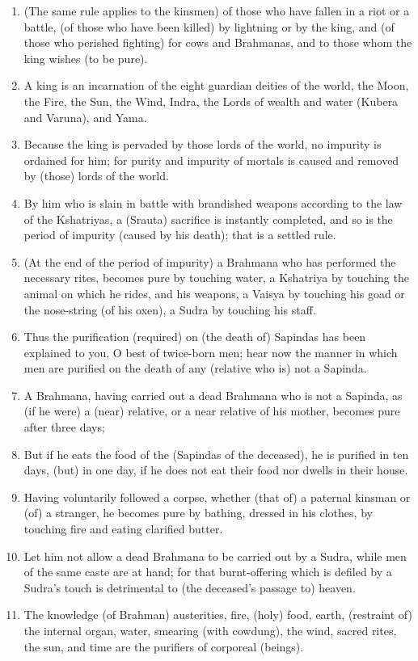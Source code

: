 \begin{enumerate}
\item (The same rule applies to the kinsmen) of those who have fallen in a riot or a battle, (of those who have been killed) by lightning or by the king, and (of those who perished fighting) for cows and Brahmanas, and to those whom the king wishes (to be pure).
\item A king is an incarnation of the eight guardian deities of the world, the Moon, the Fire, the Sun, the Wind, Indra, the Lords of wealth and water (Kubera and Varuna), and Yama.
\item Because the king is pervaded by those lords of the world, no impurity is ordained for him; for purity and impurity of mortals is caused and removed by (those) lords of the world.
\item By him who is slain in battle with brandished weapons according to the law of the Kshatriyas, a (Srauta) sacrifice is instantly completed, and so is the period of impurity (caused by his death); that is a settled rule.
\item (At the end of the period of impurity) a Brahmana who has performed the necessary rites, becomes pure by touching water, a Kshatriya by touching the animal on which he rides, and his weapons, a Vaisya by touching his goad or the nose-string (of his oxen), a Sudra by touching his staff.
\item Thus the purification (required) on (the death of) Sapindas has been explained to you, O best of twice-born men; hear now the manner in which men are purified on the death of any (relative who is) not a Sapinda.
\item A Brahmana, having carried out a dead Brahmana who is not a Sapinda, as (if he were) a (near) relative, or a near relative of his mother, becomes pure after three days;
\item But if he eats the food of the (Sapindas of the deceased), he is purified in ten days, (but) in one day, if he does not eat their food nor dwells in their house.
\item Having voluntarily followed a corpse, whether (that of) a paternal kinsman or (of) a stranger, he becomes pure by bathing, dressed in his clothes, by touching fire and eating clarified butter.
\item Let him not allow a dead Brahmana to be carried out by a Sudra, while men of the same caste are at hand; for that burnt-offering which is defiled by a Sudra's touch is detrimental to (the deceased's passage to) heaven.
\item The knowledge (of Brahman) austerities, fire, (holy) food, earth, (restraint of) the internal organ, water, smearing (with cowdung), the wind, sacred rites, the sun, and time are the purifiers of corporeal (beings).

\end{enumerate}
